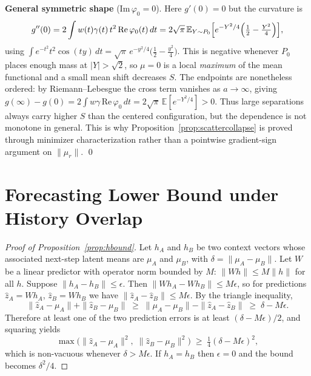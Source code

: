 \documentclass[10pt]{article}
\theoremstyle{remark}
\begin{document}
\textbf{General symmetric shape} ($\mathrm{Im}\,\varphi_0 = 0$). Here $g'(0) = 0$ but the curvature is
\[
g''(0) = 2\int w(t)\gamma(t)\,t^2\,\mathrm{Re}\,\varphi_0(t)\,dt = 2\sqrt{\pi}\,\mathbb{E}_{Y \sim P_0}\Bigl[e^{-Y^2/4}\Bigl(\tfrac12 - \tfrac{Y^2}{4}\Bigr)\Bigr],
\]
using $\int e^{-t^2} t^2 \cos(ty)\,dt = \sqrt{\pi}\, e^{-y^2/4}\bigl(\tfrac12 - \tfrac{y^2}{4}\bigr)$. This is negative whenever $P_0$ places enough mass at $|Y| > \sqrt{2}$, so $\mu = 0$ is a local \emph{maximum} of the mean functional and a small mean shift decreases $S$. The endpoints are nonetheless ordered: by Riemann--Lebesgue the cross term vanishes as $a \to \infty$, giving $g(\infty) - g(0) = 2\int w\gamma\,\mathrm{Re}\,\varphi_0\,dt = 2\sqrt{\pi}\,\mathbb{E}[e^{-Y^2/4}] > 0$. Thus large separations always carry higher $S$ than the centered configuration, but the dependence is not monotone in general. This is why Proposition~\ref{prop:scattercollapse} is proved through minimizer characterization rather than a pointwise gradient-sign argument on $\|\mu_r\|$. \qed

\section{Forecasting Lower Bound under History Overlap}
\label{app:hbound}

\begin{proof}[Proof of Proposition~\ref{prop:hbound}]
Let $h_A$ and $h_B$ be two context vectors whose associated next-step latent means are $\mu_A$ and $\mu_B$, with $\delta = \|\mu_A - \mu_B\|$. Let $W$ be a linear predictor with operator norm bounded by $M$: $\|Wh\| \le M\|h\|$ for all $h$. Suppose $\|h_A - h_B\| \le \epsilon$. Then $\|Wh_A - Wh_B\| \le M\epsilon$, so for predictions $\hat{z}_A = Wh_A$, $\hat{z}_B = Wh_B$ we have $\|\hat{z}_A - \hat{z}_B\| \le M\epsilon$. By the triangle inequality,
\[
\|\hat{z}_A - \mu_A\| + \|\hat{z}_B - \mu_B\| \;\ge\; \|\mu_A - \mu_B\| - \|\hat{z}_A - \hat{z}_B\| \;\ge\; \delta - M\epsilon .
\]
Therefore at least one of the two prediction errors is at least $(\delta - M\epsilon)/2$, and squaring yields
\[
\max\bigl(\|\hat{z}_A - \mu_A\|^2,\; \|\hat{z}_B - \mu_B\|^2\bigr) \;\ge\; \tfrac14(\delta - M\epsilon)^2,
\]
which is non-vacuous whenever $\delta > M\epsilon$. If $h_A = h_B$ then $\epsilon = 0$ and the bound becomes $\delta^2/4$.
\end{proof}



\end{document}
